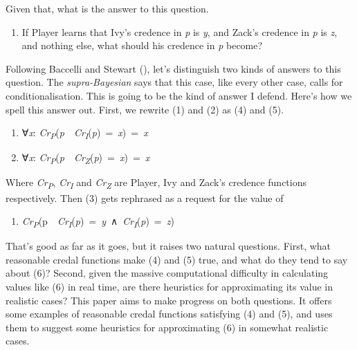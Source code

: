 \documentclass[
  10pt,
  letterpaper,
  DIV=11,
  numbers=noendperiod,
  twoside]{scrartcl}
\providecommand{\tightlist}{%
  \setlength{\itemsep}{0pt}\setlength{\parskip}{0pt}}\usepackage{longtable,booktabs,array}
\begin{document}
Given that, what is the answer to this question.

\begin{enumerate}
\def\labelenumi{(\arabic{enumi})}
\setcounter{enumi}{2}
\tightlist
\item
  If Player learns that Ivy's credence in \emph{p} is \emph{y}, and
  Zack's credence in \emph{p} is \emph{z}, and nothing else, what should
  his credence in \emph{p} become?
\end{enumerate}

Following Baccelli and Stewart
(), let's distinguish two kinds
of answers to this question. The \emph{supra-Bayesian} says that this
case, like every other case, calls for conditionalisation. This is going
to be the kind of answer I defend. Here's how we spell this answer out.
First, we rewrite (1) and (2) as (4) and (5).

\begin{enumerate}
\def\labelenumi{(\arabic{enumi})}
\setcounter{enumi}{3}
\tightlist
\item
  ∀\emph{x}:
  \emph{Cr\textsubscript{P}}(\emph{p}~\textbar~\emph{Cr\textsubscript{I}}(\emph{p})~=~\emph{x})~=~\emph{x}
\item
  ∀\emph{x}:
  \emph{Cr\textsubscript{P}}(\emph{p}~\textbar~\emph{Cr\textsubscript{Z}}(\emph{p})~=~\emph{x})~=~\emph{x}
\end{enumerate}

Where \emph{Cr\textsubscript{P}}, \emph{Cr\textsubscript{I}} and
\emph{Cr\textsubscript{Z}} are Player, Ivy and Zack's credence functions
respectively. Then (3) gets rephrased as a request for the value of

\begin{enumerate}
\def\labelenumi{(\arabic{enumi})}
\setcounter{enumi}{5}
\tightlist
\item
  \emph{Cr\textsubscript{P}}(p~\textbar~\emph{Cr\textsubscript{I}}(\emph{p})~=~\emph{y}~∧~\emph{Cr\textsubscript{I}}(\emph{p})~=~\emph{z})
\end{enumerate}

That's good as far as it goes, but it raises two natural questions.
First, what reasonable credal functions make (4) and (5) true, and what
do they tend to say about (6)? Second, given the massive computational
difficulty in calculating values like (6) in real time, are there
heuristics for approximating its value in realistic cases? This paper
aims to make progress on both questions. It offers some examples of
reasonable credal functions satisfying (4) and (5), and uses them to
suggest some heuristics for approximating (6) in somewhat realistic
cases.
\end{document}

